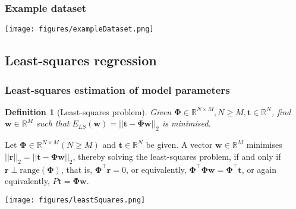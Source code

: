 \documentclass[11pt]{beamer}
\newtheorem{probDef}{Definition}
\begin{document}
\begin{frame}
    \frametitle{Example dataset}

    \begin{center}
        \texttt{[image: figures/exampleDataset.png]}
    \end{center}
    \hfill\scriptsize\citet{bishop06}

\end{frame}

\subsection{Least-squares regression}

\begin{frame}
    \frametitle{Least-squares estimation of model parameters
    \citep{trefethenAndBau97}}

    \scriptsize
    \begin{probDef}[Least-squares problem]
        Given $\boldsymbol{\Phi}\in\mathbb{R}^{N\times M},N\ge
        M,\mathbf{t}\in\mathbb{R}^N$, find $\mathbf{w}\in\mathbb{R}^M$ such
        that $E_{LS}(\mathbf{w})=||\mathbf{t}-\boldsymbol{\Phi}\boldsymbol{w}||_2$ is minimised.
    \end{probDef}
    \begin{theorem}
        Let $\boldsymbol{\Phi}\in\mathbb{R}^{N\times M} (N\ge M)$ and
        $\mathbf{t}\in\mathbb{R}^N$ be given. A vector
        $\mathbf{w}\in\mathbb{R}^M$ minimises
        $||\mathbf{r}||_2=||\mathbf{t}-\boldsymbol{\Phi}\mathbf{w}||_2$, thereby solving the
        least-squares problem, if and only if
        $\mathbf{r}\perp\text{range}(\boldsymbol{\Phi})$, that is,
        $\boldsymbol{\Phi}^\intercal\mathbf{r}=0$,
        or equivalently,
        $\boldsymbol{\Phi}^\intercal\boldsymbol{\Phi}\mathbf{w}=\boldsymbol\Phi^\intercal\mathbf{t}$,
        or again equivalently,
        $P\mathbf{t}=\boldsymbol{\Phi}\mathbf{w}$.
    \end{theorem}
	\begin{center}
		\texttt{[image: figures/leastSquares.png]}
	\end{center}
    \hfill\scriptsize\citet{bishop06}
    \normalsize

\end{frame}
\end{document}
